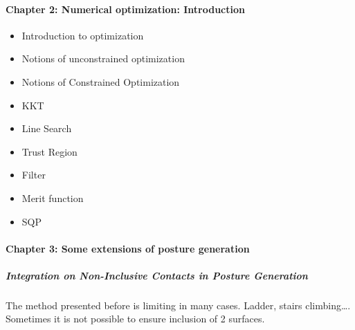 \documentclass{article}
\begin{document}

\paragraph {Chapter 2: Numerical optimization: Introduction}
\begin{itemize}
  \item Introduction to optimization
  \item Notions of unconstrained optimization
  \item Notions of Constrained Optimization
  \item KKT
  \item Line Search
  \item Trust Region
  \item Filter
  \item Merit function
  \item SQP
\end{itemize}



\paragraph {Chapter 3: Some extensions of posture generation}
\subparagraph{Integration on Non-Inclusive Contacts in Posture Generation}

The method presented before is limiting in many cases. Ladder, stairs climbing\dots.
Sometimes it is not possible to ensure inclusion of 2 surfaces.
\end{document}
